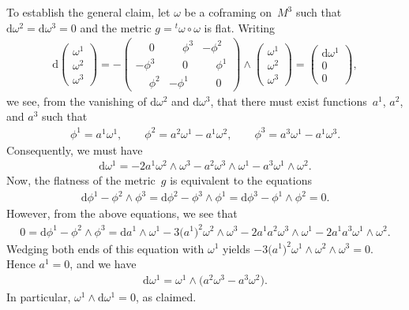 \documentclass[pdftex]{sigma}
\numberwithin{equation}{section}
\renewcommand{\d}{\mathrm{d}}%
\newcommand{\phm}{\phantom{-}}
\begin{document}
\begin{Example}
To establish the general claim, let $\omega$ be a coframing on~$M^3$ such that $\d\omega^2=\d\omega^3=0$
and the metric $g = {}^t\omega\circ \omega$ is flat.
Writing
\begin{gather*}
\d\begin{pmatrix}\omega^1\\ \omega^2\\ \omega^3\end{pmatrix}
=-\begin{pmatrix}\phm0&\phm\phi^3&-\phi^2\\-\phi^3&\phm0&\phm\phi^1\\
\phm\phi^2&-\phi^1&\phm0\end{pmatrix}
\wedge \begin{pmatrix}\omega^1\\ \omega^2\\ \omega^3\end{pmatrix}
= \begin{pmatrix}\d\omega^1\\0\\0\end{pmatrix},
\end{gather*}
we see, from the vanishing of $\d\omega^2$ and $\d\omega^3$, that there must exist functions~$a^1$, $a^2$, and $a^3$
such that
\begin{gather*}
\phi^1 = a^1 \omega^1,\qquad
\phi^2 = a^2 \omega^1 - a^1 \omega^2,\qquad
\phi^3 = a^3 \omega^1 - a^1 \omega^3.
\end{gather*}
Consequently, we must have
\begin{gather*}
\d\omega^1 = -2a^1 \omega^2\wedge\omega^3 - a^2 \omega^3\wedge\omega^1 - a^3 \omega^1\wedge\omega^2.
\end{gather*}
Now, the flatness of the metric~$g$ is equivalent to the equations
\begin{gather*}
\d\phi^1-\phi^2\wedge\phi^3 = \d\phi^2-\phi^3\wedge\phi^1 = \d\phi^3-\phi^1\wedge\phi^2 = 0.
\end{gather*}
However, from the above equations, we see that
\begin{gather*}
0 = \d\phi^1-\phi^2\wedge\phi^3
= \d a^1\wedge\omega^1 -3\big(a^1\big)^2 \omega^2\wedge\omega^3
 -2a^1a^2 \omega^3\wedge\omega^1-2a^1a^3 \omega^1\wedge\omega^2.
\end{gather*}
Wedging both ends of this equation with $\omega^1$ yields
$-3\big(a^1\big)^2 \omega^1\wedge\omega^2\wedge\omega^3 = 0$. Hence $a^1 = 0$,
and we have
\begin{gather*}
\d\omega^1 = \omega^1\wedge\big(a^2 \omega^3-a^3 \omega^2\big).
\end{gather*}
In particular, $\omega^1\wedge\d\omega^1 = 0$, as claimed.


\end{Example}
\end{document}
